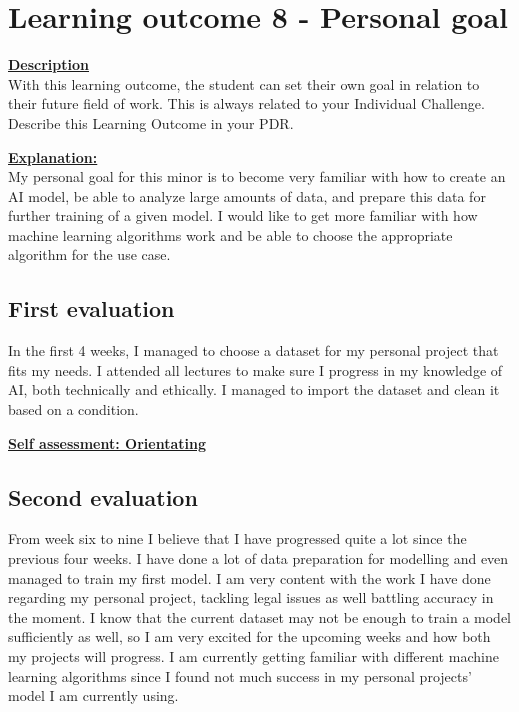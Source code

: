 \documentclass{article}
\begin{document}
\section{Learning outcome 8 - Personal goal}
\underline{\textbf{Description}}\\
With this learning outcome, the student can set their own goal in relation to their future field of work.
This is always related to your Individual Challenge. Describe this Learning Outcome in your PDR.

\underline{\textbf{Explanation:}}\\
My personal goal for this minor is to become very familiar with how to create an AI model, be able to analyze large amounts of data,
and prepare this data for further training of a given model. I would like to get more familiar with how machine learning algorithms work 
and be able to choose the appropriate algorithm for the use case.

\subsection{First evaluation}
In the first 4 weeks, I managed to choose a dataset for my personal project that fits my needs. I attended all lectures to make 
sure I progress in my knowledge of AI, both technically and ethically. I managed to import the dataset and clean it based on a condition.

\underline{\textbf{Self assessment: Orientating}}

\subsection{Second evaluation}
From week six to nine I believe that I have progressed quite a lot since the previous four weeks. I have done a lot of data preparation for 
modelling and even managed to train my first model. I am very content with the work I have done regarding my personal project, tackling legal issues 
as well battling accuracy in the moment. I know that the current dataset may not be enough to train a model sufficiently as well, so I am very excited for the 
upcoming weeks and how both my projects will progress. I am currently getting familiar with different machine learning algorithms since I found not much 
success in my personal projects' model I am currently using.
\end{document}
